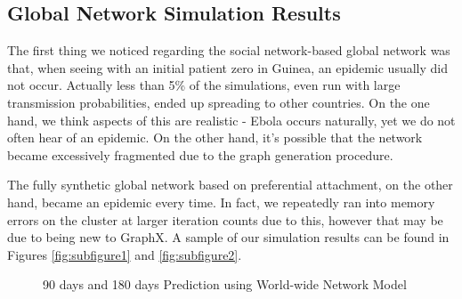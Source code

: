 \documentclass[10pt, journal,onecolumn]{IEEEtran}
\begin{document}
\subsection{{Global Network Simulation Results}}

The first thing we noticed regarding the social network-based global network was that, when seeing
with an initial patient zero in Guinea, an epidemic usually did not occur. Actually less than 5\%
of the simulations, even run with large transmission probabilities, ended up spreading to other
countries. On the one hand, we think aspects of this are realistic - Ebola occurs naturally, yet we
do not often hear of an epidemic. On the other hand, it's possible that the network became excessively
fragmented due to the graph generation procedure.

The fully synthetic global network based on preferential attachment, on the other hand, became an
epidemic every time. In fact, we repeatedly ran into memory errors on the cluster at larger iteration
counts due to this, however that may be due to being new to GraphX. A sample of our simulation results
can be found in Figures \ref{fig:subfigure1} and \ref{fig:subfigure2}.

\begin{figure}[ht]
\centering
{}
\quad
{}
  \caption{90 days and 180 days Prediction using World-wide Network Model}
  \label{Fig:WorldPredictNetwork}
\end{figure}
\end{document}
